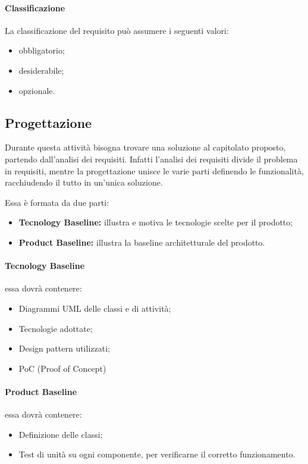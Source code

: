 \paragraph{Classificazione} La classificazione del requisito può assumere i seguenti valori:
\begin{itemize}
    \item obbligatorio;
    \item desiderabile;
    \item opzionale.
\end{itemize}

\subsection{Progettazione}
Durante questa attività bisogna trovare una soluzione al capitolato proposto, partendo dall'analisi dei requisiti. Infatti l'analisi dei requisiti divide il problema in requisiti, mentre la progettazione unisce le varie parti definendo le funzionalità, racchiudendo il tutto in un'unica soluzione.

Essa è formata da due parti:
\begin{itemize}
    \item \textbf{Tecnology Baseline:} illustra e motiva le tecnologie scelte per il prodotto;
    \item \textbf{Product Baseline:} illustra la baseline architetturale del prodotto.
\end{itemize}

\paragraph{Tecnology Baseline} essa dovrà contenere:

\begin{itemize}
    \item Diagrammi UML delle classi e di attività;
    \item Tecnologie adottate;
    \item Design pattern utilizzati;
    \item PoC (Proof of Concept)
\end{itemize}

\paragraph{Product Baseline} essa dovrà contenere:

\begin{itemize}
    \item Definizione delle classi;
    \item Test di unità su ogni componente, per verificarne il corretto funzionamento.
\end{itemize}

